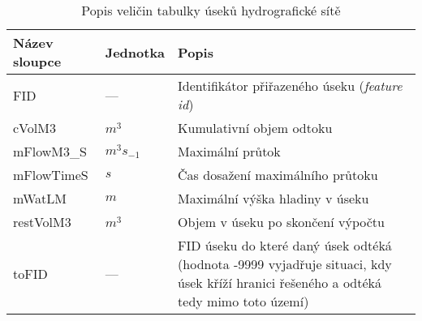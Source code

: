 



\begin{table}[h!]
 

 \centering
 \caption{Popis veličin  tabulky úseků hydrografické sítě}
\label{tab:useky}

 \begin{tabular}{llp{}}
  \hline  \hline
 Název sloupce        & Jednotka     & Popis                                 \\ 
 \hline
 FID            &   ---          &  Identifikátor přiřazeného úseku ({\it feature id})   \\
 cVolM3         &  $m^3$         & Kumulativní objem odtoku                              \\
 mFlowM3\_S      &   $m^3s_{-1}$  & Maximální průtok                                      \\
 mFlowTimeS     &   $s$          &  Čas dosažení maximálního průtoku                     \\
 mWatLM         &  $m$       &  Maximální výška hladiny v úseku                               \\
 restVolM3      &  $m^3$     &  Objem v úseku po skončení výpočtu         \\
 toFID          &  ---       &  FID úseku do které daný úsek odtéká (hodnota -9999 vyjadřuje situaci, kdy úsek kříží hranici řešeného a odtéká tedy mimo toto území) \\
  \hline
   \hline
 \end{tabular}

\end{table}




